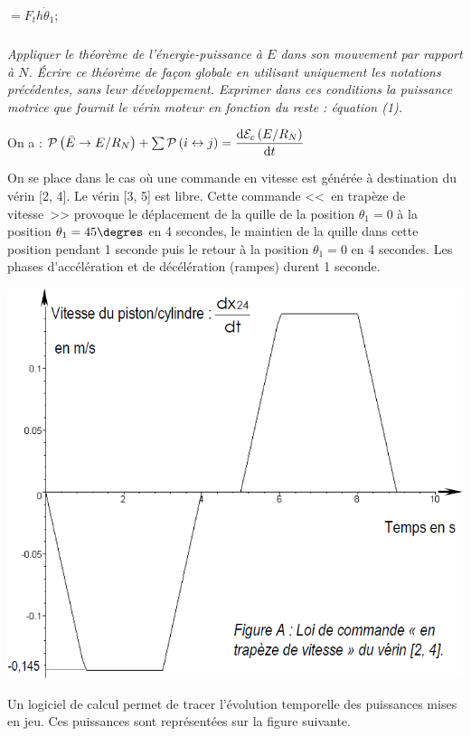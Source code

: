 \documentclass[10pt,fleqn]{article} %
\begin{document}
\begin{multicols}{2}
\begin{multicols}{2}
\begin{corrige}
\begin{itemize}
$=F_t h \dot{\theta}_1$;

\end{itemize}
\end{corrige}
\else
\fi

\subparagraph{}\textit{Appliquer le théorème de l’énergie-puissance à $E$ dans son mouvement par rapport à $N$. Écrire ce
théorème de façon globale en utilisant uniquement les notations précédentes, sans leur
développement. Exprimer dans ces conditions la puissance motrice que fournit le vérin moteur en
fonction du reste : équation (1).}
\ifprof
\begin{corrige}
On a :
$\mathcal{P}\left(\bar{E}\rightarrow E/R_N\right) + \sum \mathcal{P}\left(i \stackrel{\text{}}{\leftrightarrow} j\right)=\dfrac{\text{d} \mathcal{E}_c\left(E/R_N\right)}{\text{d} t}$
\end{corrige}
\else
\fi

\ifprof
\else

On se place dans le cas où une commande en vitesse est générée à destination du vérin [2, 4]. Le vérin [3, 5]
est libre. Cette commande <<~en trapèze de vitesse~>>  provoque le déplacement de la quille de la position $\theta_1=0$
 à la position $\theta_1 = 45\degres$ en 4 secondes, le maintien de la quille dans cette position pendant 1 seconde puis le
 retour à la position $\theta_1=0$ en 4 secondes. Les phases d’accélération et de décélération (rampes) durent 1 seconde.


\begin{center}
\includegraphics[width=.6\linewidth]{images/fig_06}
\end{center}

Un logiciel de calcul permet de tracer l’évolution temporelle des puissances mises en jeu. Ces puissances sont
représentées sur la figure suivante. 


\end{multicols}
\end{multicols}
\end{document}

